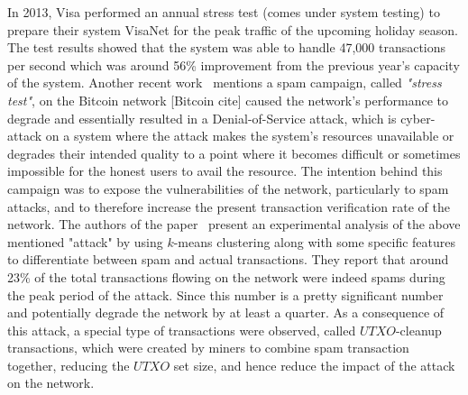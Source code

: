 In 2013, Visa performed an annual stress test (comes under system testing) to prepare their system VisaNet for the peak traffic of the upcoming holiday season. The test results showed that the system was able to handle 47,000 transactions per second which was around 56\% improvement from the previous year's capacity of the system. %
Another recent work~\cite{baqer2016stressing} mentions a spam campaign, called \textit{"stress test"}, on the Bitcoin network [Bitcoin cite] caused the network's performance to degrade and essentially resulted in a Denial-of-Service attack, which is cyber-attack on a system where the attack makes the system's resources unavailable or degrades their intended quality to a point where it becomes difficult or sometimes impossible for the honest users to avail the resource. The intention behind this campaign was to expose the vulnerabilities of the network, particularly to spam attacks, and to therefore increase the present transaction verification rate of the network. The authors of the paper~\cite{baqer2016stressing} present an experimental analysis of the above mentioned "attack" by using $k$-means clustering along with some specific features to differentiate between spam and actual transactions. They report that around 23\% of the total transactions flowing on the network were indeed spams during the peak period of the attack. Since this number is a pretty significant number and potentially degrade the network by at least a quarter. As a consequence of this attack, a special type of transactions were observed, called $UTXO$-cleanup transactions, which were created by miners to combine spam transaction together, reducing the $UTXO$ set size, and hence reduce the impact of the attack on the network. 

